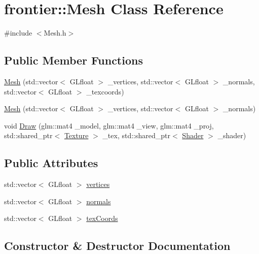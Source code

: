 \hypertarget{classfrontier_1_1_mesh}{}\section{frontier\+:\+:Mesh Class Reference}
\label{classfrontier_1_1_mesh}


{\ttfamily \#include $<$Mesh.\+h$>$}

\subsection*{Public Member Functions}
\begin{DoxyCompactItemize}
\item 
\hyperlink{classfrontier_1_1_mesh_a6eaa947b29b59b45fca5fae502b04de7}{Mesh} (std\+::vector$<$ G\+Lfloat $>$ \+\_\+vertices, std\+::vector$<$ G\+Lfloat $>$ \+\_\+normals, std\+::vector$<$ G\+Lfloat $>$ \+\_\+texcoords)
\item 
\hyperlink{classfrontier_1_1_mesh_a5bc251528ec00975e49ba3f156955a3f}{Mesh} (std\+::vector$<$ G\+Lfloat $>$ \+\_\+vertices, std\+::vector$<$ G\+Lfloat $>$ \+\_\+normals)
\item 
void \hyperlink{classfrontier_1_1_mesh_a37daa84e24b750bb8b488794fa34ed1e}{Draw} (glm\+::mat4 \+\_\+model, glm\+::mat4 \+\_\+view, glm\+::mat4 \+\_\+proj, std\+::shared\+\_\+ptr$<$ \hyperlink{classfrontier_1_1_texture}{Texture} $>$ \+\_\+tex, std\+::shared\+\_\+ptr$<$ \hyperlink{classfrontier_1_1_shader}{Shader} $>$ \+\_\+shader)
\end{DoxyCompactItemize}
\subsection*{Public Attributes}
\begin{DoxyCompactItemize}
\item 
std\+::vector$<$ G\+Lfloat $>$ \hyperlink{classfrontier_1_1_mesh_adb7547dcfcfeac9f058c54d278f8046a}{vertices}
\item 
std\+::vector$<$ G\+Lfloat $>$ \hyperlink{classfrontier_1_1_mesh_a4edd8881188aec021d81b60e7b240fe8}{normals}
\item 
std\+::vector$<$ G\+Lfloat $>$ \hyperlink{classfrontier_1_1_mesh_a67d643f39d706e80ae2d91d2eefea047}{tex\+Coords}
\end{DoxyCompactItemize}


\subsection{Constructor \& Destructor Documentation}
\mbox{\label{classfrontier_1_1_mesh_a6eaa947b29b59b45fca5fae502b04de7}} 
